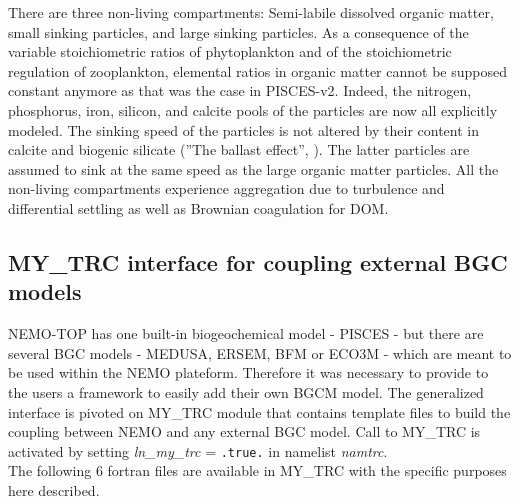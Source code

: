 \documentclass[../main/TOP_manual]{subfiles}
\begin{document}
There are three non-living compartments: Semi-labile dissolved organic matter, small sinking particles, and large sinking particles.
As a consequence of the variable stoichiometric ratios of phytoplankton and of the stoichiometric regulation of zooplankton, elemental ratios in organic matter cannot be supposed constant anymore as that was the case in PISCES-v2.
Indeed, the nitrogen, phosphorus, iron, silicon, and calcite pools of the particles are now all explicitly modeled.
The sinking speed of the particles is not altered by their content in calcite and biogenic silicate (''The ballast effect'', \citep{honjo_1996,armstrong_2001}).
The latter particles are assumed to sink at the same speed as the large organic matter particles.
All the non-living compartments experience aggregation due to turbulence and differential settling as well as Brownian coagulation for DOM.

\subsection{MY\_TRC interface for coupling external BGC models}
\label{Mytrc}

NEMO-TOP has one built-in biogeochemical model - PISCES - but there are several BGC models - MEDUSA, ERSEM, BFM or ECO3M - which are meant to be used within the NEMO plateform.
Therefore it was necessary to provide to the users a framework to easily add their own BGCM model.
The generalized interface is pivoted on MY\_TRC module that contains template files to build the coupling between NEMO and any external BGC model.
Call to MY\_TRC is activated by setting  \textit{ln\_my\_trc} = \texttt{.true.} in namelist \textit{namtrc}.\\

The following 6 fortran files are available in MY\_TRC with the specific purposes here described.
\end{document}
